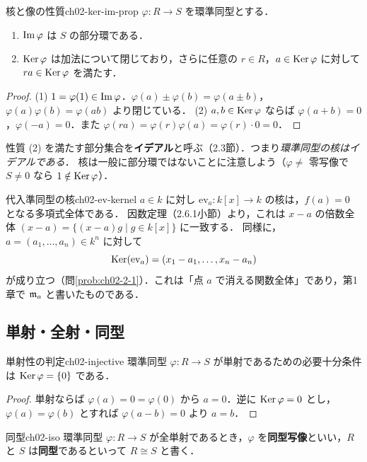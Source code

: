\begin{myprop}{核と像の性質}{ch02-ker-im-prop}
$\varphi:R\to S$ を環準同型とする．
\begin{enumerate}
  \item $\operatorname{Im}\varphi$ は $S$ の部分環である．
  \item $\operatorname{Ker}\varphi$ は加法について閉じており，さらに任意の $r\in R$，$a\in\operatorname{Ker}\varphi$ に対して $ra\in\operatorname{Ker}\varphi$ を満たす．
\end{enumerate}
\end{myprop}

\begin{proof}
(1) $1=\varphi(1)\in\operatorname{Im}\varphi$．$\varphi(a)\pm\varphi(b)=\varphi(a\pm b)$，$\varphi(a)\varphi(b)=\varphi(ab)$ より閉じている．
(2) $a,b\in\operatorname{Ker}\varphi$ ならば $\varphi(a+b)=0$，$\varphi(-a)=0$．また $\varphi(ra)=\varphi(r)\varphi(a)=\varphi(r)\cdot0=0$．
\end{proof}

性質 (2) を満たす部分集合を\textbf{イデアル}と呼ぶ（2.3節）．つまり\emph{環準同型の核はイデアルである}．
核は一般に部分環ではないことに注意しよう（$\varphi\ne$ 零写像で $S\ne0$ なら $1\notin\operatorname{Ker}\varphi$）．

\begin{myex}{代入準同型の核}{ch02-ev-kernel}
$a\in k$ に対し $\mathrm{ev}_a:k[x]\to k$ の核は，$f(a)=0$ となる多項式全体である．
因数定理（2.6.1小節）より，これは $x-a$ の倍数全体 $(x-a)=\{(x-a)g\mid g\in k[x]\}$ に一致する．
同様に，$a=(a_1,\dots,a_n)\in k^n$ に対して
\[
  \operatorname{Ker}(\mathrm{ev}_a)=(x_1-a_1,\dots,x_n-a_n)
\]
が成り立つ（問\ref{prob:ch02-2-1}）．これは「点 $a$ で消える関数全体」であり，第1章で $\mathfrak{m}_a$ と書いたものである．
\end{myex}

\subsection{単射・全射・同型}

\begin{myprop}{単射性の判定}{ch02-injective}
環準同型 $\varphi:R\to S$ が単射であるための必要十分条件は $\operatorname{Ker}\varphi=\{0\}$ である．
\end{myprop}

\begin{proof}
単射ならば $\varphi(a)=0=\varphi(0)$ から $a=0$．逆に $\operatorname{Ker}\varphi=0$ とし，$\varphi(a)=\varphi(b)$ とすれば $\varphi(a-b)=0$ より $a=b$．
\end{proof}

\begin{mydef}{同型}{ch02-iso}
環準同型 $\varphi:R\to S$ が全単射であるとき，$\varphi$ を\textbf{同型写像}といい，$R$ と $S$ は\textbf{同型}であるといって $R\cong S$ と書く．
\end{mydef}

